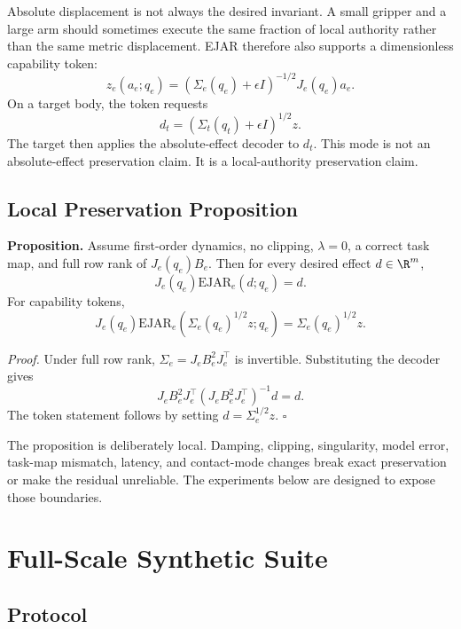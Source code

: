 \documentclass{article}
\newcommand{\EJAR}{\mathrm{EJAR}}
\begin{document}
Absolute displacement is not always the desired invariant. A small gripper and a large arm should sometimes execute the same fraction of local authority rather than the same metric displacement. EJAR therefore also supports a dimensionless capability token:
\begin{equation}
z_e(a_e;q_e)=\left(\Sigma_e(q_e)+\epsilon I\right)^{-1/2}J_e(q_e)a_e.
\end{equation}
On a target body, the token requests
\begin{equation}
d_t=\left(\Sigma_t(q_t)+\epsilon I\right)^{1/2}z.
\end{equation}
The target then applies the absolute-effect decoder to $d_t$. This mode is not an absolute-effect preservation claim. It is a local-authority preservation claim.

\subsection{Local Preservation Proposition}

\textbf{Proposition.}
Assume first-order dynamics, no clipping, $\lambda=0$, a correct task map, and full row rank of $J_e(q_e)B_e$. Then for every desired effect $d\in\R^m$,
\begin{equation}
J_e(q_e)\EJAR_e(d;q_e)=d.
\end{equation}
For capability tokens,
\begin{equation}
J_e(q_e)\EJAR_e(\Sigma_e(q_e)^{1/2}z;q_e)=\Sigma_e(q_e)^{1/2}z.
\end{equation}

\emph{Proof.}
Under full row rank, $\Sigma_e=J_eB_e^2J_e^\top$ is invertible. Substituting the decoder gives
\begin{equation}
J_eB_e^2J_e^\top\left(J_eB_e^2J_e^\top\right)^{-1}d=d.
\end{equation}
The token statement follows by setting $d=\Sigma_e^{1/2}z$. \hfill $\square$

The proposition is deliberately local. Damping, clipping, singularity, model error, task-map mismatch, latency, and contact-mode changes break exact preservation or make the residual unreliable. The experiments below are designed to expose those boundaries.

\section{Full-Scale Synthetic Suite}

\subsection{Protocol}
\end{document}

